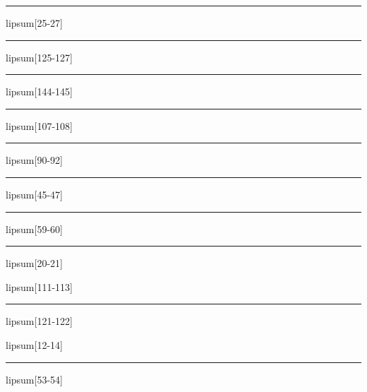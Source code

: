 \documentclass[11pt,a4paper]{article}
\begin{document}
\begin{simplewrap}
  \textcolor{brown!53}{\rule{5.4cm}{4.2cm}}
\end{simplewrap}
lipsum[25-27]

\begin{simplewrap}
  \textcolor{lime!19}{\rule{3.0cm}{6.1cm}}
\end{simplewrap}
lipsum[125-127]

\begin{simplewrap}
  \textcolor{cyan!16}{\rule{3.7cm}{6.0cm}}
\end{simplewrap}
lipsum[144-145]

\begin{simplewrap}
  \textcolor{cyan!44}{\rule{5.1cm}{7.6cm}}
\end{simplewrap}
lipsum[107-108]

\begin{simplewrap}
  \textcolor{green!17}{\rule{5.5cm}{9.4cm}}
\end{simplewrap}
lipsum[90-92]

\begin{simplewrap}
  \textcolor{lime!18}{\rule{5.5cm}{9.1cm}}
\end{simplewrap}
lipsum[45-47]

\begin{simplewrap}
  \textcolor{red!57}{\rule{5.4cm}{3.8cm}}
\end{simplewrap}
lipsum[59-60]

\begin{simplewrap}
  \textcolor{yellow!18}{\rule{5.9cm}{5.4cm}}
\end{simplewrap}
lipsum[20-21]

lipsum[111-113]

\begin{simplewrap}
  \textcolor{blue!22}{\rule{3.3cm}{8.3cm}}
\end{simplewrap}
lipsum[121-122]

lipsum[12-14]

\begin{simplewrap}
  \textcolor{green!29}{\rule{5.0cm}{8.0cm}}
\end{simplewrap}
lipsum[53-54]
\end{document}
